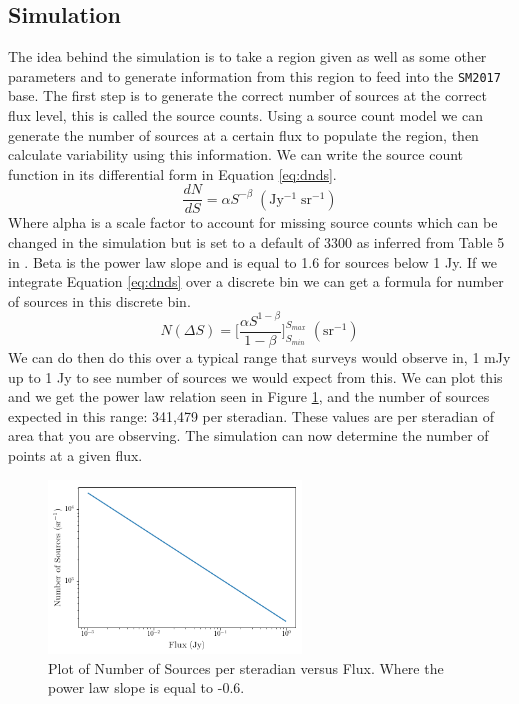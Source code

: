 \documentclass[a4paper]{article}
\begin{document}
\subsection{Simulation}
The idea behind the simulation is to take a region given as well as some other parameters and to generate information from this region to feed into the \texttt{SM2017} base. The first step is to generate the correct number of sources at the correct flux level, this is called the source counts. Using a source count model we can generate the number of sources at a certain flux to populate the region, then calculate variability using this information. We can write the source count function in its differential form in Equation \ref{eq:dnds}.
\begin{equation}\label{eq:dnds}
    \dfrac{dN}{dS}= \alpha S^{-\beta} \; \mathrm{(Jy^{-1} \; sr^{-1})}
\end{equation}
Where alpha is a scale factor to account for missing source counts which can be changed in the simulation but is set to a default of 3300 as inferred from Table 5 in \citet{Intema}. Beta is the power law slope and is equal to 1.6 for sources below 1 Jy. If we integrate Equation \ref{eq:dnds} over a discrete bin we can get a formula for number of sources in this discrete bin.
\begin{equation}\label{eq:NS}
    N(\Delta S)= \bigg[\dfrac{\alpha S^{1-\beta}}{1-\beta}\bigg]^{S_{max}}_{S_{min}} \; \mathrm{(sr^{-1})}
\end{equation}
We can do then do this over a typical range that surveys would observe in, 1 mJy up to 1 Jy to see number of sources we would expect from this. We can plot this and we get the power law relation seen in Figure \ref{fig:LNLS}, and the number of sources expected in this range: 341,479 per steradian. These values are per steradian of area that you are observing. The simulation can now determine the number of points at a given flux.
\begin{figure}[H]

\begin{center}
  \includegraphics[width=0.6\textwidth]{dnds.png}
  \caption{Plot of Number of Sources per steradian versus Flux. Where the power law slope is equal to -0.6. }
  \label{fig:LNLS}
\end{center}
\end{figure}
\end{document}
